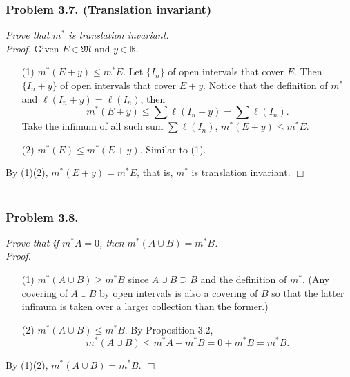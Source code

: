\documentclass{article}
\begin{document}
\subsubsection*{Problem 3.7. (Translation invariant)}
\emph{Prove that $m^{*}$ is translation invariant.} \\



\emph{Proof.}
Given $E \in \mathfrak{M}$ and $y \in \mathbb{R}$.
\begin{enumerate}
\item[(1)]
  $m^{*}(E + y) \leq m^{*}E$.
  Let $\{ I_n \}$ of open intervals that cover $E$.
  Then $\{ I_n+y \}$ of open intervals that cover $E+y$.
  Notice that the definition of $m^{*}$ and $\ell(I_n+y) = \ell(I_n)$, then
  \[
    m^{*}(E + y) \leq \sum \ell(I_n+y) = \sum \ell(I_n).
  \]
  Take the infimum of all such sum $\sum \ell(I_n)$,
  $m^{*}(E + y) \leq m^{*}E$.

\item[(2)]
  $m^{*}(E) \leq m^{*}(E + y)$.
  Similar to (1).
\end{enumerate}
By (1)(2), $m^{*}(E + y) = m^{*}E$, that is, $m^{*}$ is translation invariant.
$\Box$ \\\\






\subsubsection*{Problem 3.8.}
\emph{Prove that if $m^{*}A = 0$, then $m^{*}(A \cup B) = m^{*}B$.} \\



\emph{Proof.}
\begin{enumerate}
\item[(1)]
  $m^{*}(A \cup B) \geq m^{*}B$ since $A \cup B \supseteq B$
  and the definition of $m^{*}$.
  (Any covering of $A \cup B$ by open intervals is also a covering of $B$
  so that the latter infimum is taken over a larger collection than the former.)

\item[(2)]
  $m^{*}(A \cup B) \leq m^{*}B$.
  By Proposition 3.2,
  \[
    m^{*}(A \cup B) \leq m^{*}A + m^{*}B = 0 + m^{*}B = m^{*}B.
  \]
\end{enumerate}
By (1)(2), $m^{*}(A \cup B) = m^{*}B$.
$\Box$ \\\\
\end{document}

